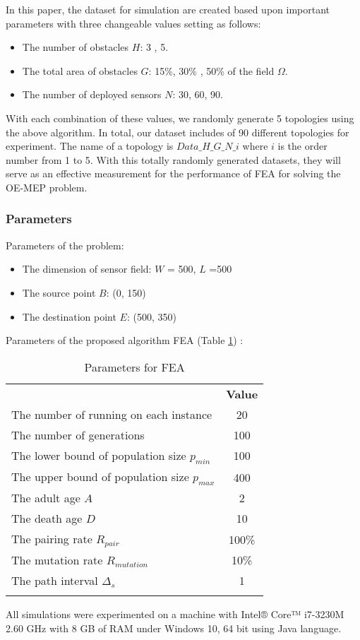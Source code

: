 \documentclass[final]{elsarticle}
\begin{document}
In this paper, the dataset for simulation are created based upon important parameters with three changeable values setting as follows:
\begin{itemize}
	\item The number of obstacles $H$: 3 , 5.
	\item The total area of obstacles $G$: 15\%, 30\% , 50\% of the field $\Omega$.
	\item The number of deployed sensors $N$: 30, 60, 90.
\end{itemize}
With each combination of these values, we randomly generate 5 topologies using the above algorithm. In total, our dataset includes of 90 different topologies for experiment. The name of a topology is $Data\_H\_G\_N\_i$ where $ i $ is the order number from 1 to 5. With this totally randomly generated datasets, they will serve as an effective measurement for the performance of FEA for solving the OE-MEP problem. 

\subsubsection{Parameters}
Parameters of the problem:
\begin{itemize}
	\item The dimension of sensor field: $ W $ = 500, $ L $ =500
	\item The source point $ B $: (0, 150) 
	\item The destination point $ E $: (500, 350)	
\end{itemize}
Parameters of the proposed algorithm FEA (Table \ref{tab1}) :
\begin{table}
	\caption{Parameters for FEA}
	\label{tab1}       %
	\begin{center}
		\renewcommand{\arraystretch}{1.5}
		\begin{tabular}{lc}
			\hline\noalign{\smallskip}
			\multicolumn{1}{c}{\textbf{Parameter}} & \textbf{Value} \\
			\noalign{\smallskip}\hline\noalign{\smallskip}
			The number of running on each instance & 20 \\
			The number of generations & 100\\
			The lower bound of population size $ p_{min} $ & 100\\
			The upper bound of population size $ p_{max} $ & 400\\
			The adult age $A$ & 2 \\
			The death age $D$ & 10 \\
			The pairing rate $ R_{pair}$  & 100\% \\
			The mutation rate $ R_{mutation} $ & 10\% \\
			The path interval $\Delta_s$ & 1 \\ 
			\noalign{\smallskip} \hline
		\end{tabular}
	\end{center}
\end{table}
All simulations were experimented on a machine with Intel® Core™ i7-3230M 2.60 GHz with 8 GB of RAM under Windows 10, 64 bit using Java language.
\end{document}
